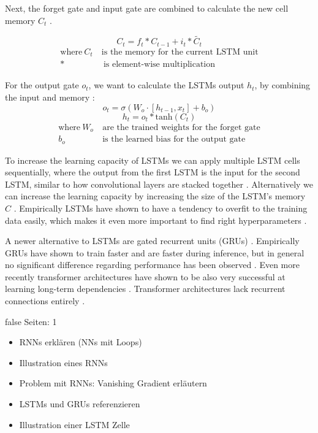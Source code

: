 \documentclass[draft,final,oneside]{vutinfth} %
\begin{document}
Next, the forget gate and input gate are combined to calculate the new cell memory $C_t$ \cite{Goodfellow-et-al-2016}.

\begin{equation}
C_t=f_t*C_{t-1} + i_t*\widetilde{C_t}
\end{equation}
\begin{align*}
\text{where}~C_t~&\text{is the memory for the current LSTM unit} \\
*&~\text{is element-wise multiplication}
\end{align*}


For the output gate $o_t$, we want to calculate the LSTMs output $h_t$, by combining the input and memory \cite{colahlstm}:
\begin{equation}
o_t=\sigma\left(W_o \cdot \left[ h_{t-1}, x_t\right] + b_o \right)
\end{equation}
\begin{equation}
h_t = o_t * \text{tanh}\left(C_t\right)
\end{equation}
\begin{align*}
\text{where}~W_o&~\text{are the trained weights for the forget gate} \\
b_o&~\text{is the learned bias for the output gate}
\end{align*}

To increase the learning capacity of LSTMs we can apply multiple LSTM cells sequentially, where the output from the first LSTM is the input for the second LSTM, similar to how convolutional layers are stacked together \cite{Goodfellow-et-al-2016}. Alternatively we can increase the learning capacity by increasing the size of the LSTM's memory $C$ \cite{Goodfellow-et-al-2016}. Empirically LSTMs have shown to have a tendency to overfit to the training data easily, which makes it even more important to find right hyperparameters \cite{rnnregularization}.

A newer alternative to LSTMs are gated recurrent units (GRUs) \cite{gru}. Empirically GRUs have shown to train faster and are faster during inference, but in general no significant difference regarding performance has been observed \cite{gru}. Even more recently transformer architectures have shown to be also very successful at learning long-term dependencies \cite{transformer}. Transformer architectures lack recurrent connections entirely \cite{transformer}.

\if false
Seiten: 1
\begin{itemize}

\item RNNs erklären (NNs mit Loops)
\item Illustration eines RNNs
\item Problem mit RNNs: Vanishing Gradient erläutern
\item LSTMs und GRUs referenzieren
\item Illustration einer LSTM Zelle

\end{itemize}
\fi
\pagebreak
\end{document}
